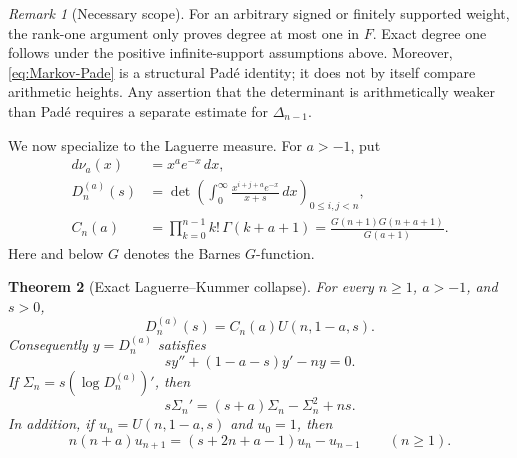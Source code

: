 \documentclass[11pt]{article}
\newtheorem{theorem}{Theorem}[section]
\theoremstyle{definition}
\theoremstyle{remark}
\newtheorem{remark}[theorem]{Remark}
\begin{document}
\begin{remark}[Necessary scope]
For an arbitrary signed or finitely supported weight, the rank-one argument
only proves degree at most one in \(F\).  Exact degree one follows under the
positive infinite-support assumptions above.  Moreover,
\eqref{eq:Markov-Pade} is a structural Pad\'e identity; it does not by itself
compare arithmetic heights.  Any assertion that the determinant is
arithmetically weaker than Pad\'e requires a separate estimate for
\(\Delta_{n-1}\).
\end{remark}

We now specialize to the Laguerre measure.  For \(a>-1\), put
\begin{align*}
 d\nu_a(x)&=x^ae^{-x}\,dx,\\
 D_n^{(a)}(s)&=
 \det\left(\int_0^\infty
 \frac{x^{i+j+a}e^{-x}}{x+s}\,dx\right)_{0\leq i,j<n},\\
 C_n(a)&=\prod_{k=0}^{n-1}k!\,\Gamma(k+a+1)
 =\frac{G(n+1)G(n+a+1)}{G(a+1)}.
\end{align*}
Here and below \(G\) denotes the Barnes \(G\)-function.

\begin{theorem}[Exact Laguerre--Kummer collapse]
\label{thm:Laguerre-Kummer-exact}
For every \(n\geq1\), \(a>-1\), and \(s>0\),
\begin{equation}
 \boxed{D_n^{(a)}(s)=C_n(a)U(n,1-a,s).}
 \label{eq:Laguerre-Kummer-exact}
\end{equation}
Consequently \(y=D_n^{(a)}\) satisfies
\begin{equation}
 sy''+(1-a-s)y'-ny=0.
 \label{eq:Kummer-Dn}
\end{equation}
If
\(\Sigma_n=s(\log D_n^{(a)})'\), then
\begin{equation}
 s\Sigma_n'=(s+a)\Sigma_n-\Sigma_n^2+ns.
 \label{eq:Riccati-Sigma}
\end{equation}
In addition, if \(u_n=U(n,1-a,s)\) and \(u_0=1\), then
\begin{equation}
 n(n+a)u_{n+1}=(s+2n+a-1)u_n-u_{n-1}
 \qquad(n\geq1).
 \label{eq:Kummer-discrete}
\end{equation}
\end{theorem}
\end{document}
